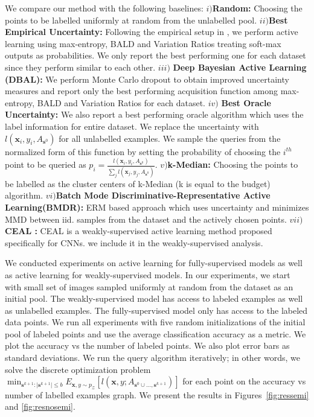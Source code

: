 \documentclass{article} %
\begin{document}
We compare our method with the following baselines: $i)$\textbf{Random:} Choosing the points to be labelled uniformly at
random from the unlabelled pool. $ii)$\textbf{Best Empirical Uncertainty:} Following the empirical setup in
\citep{gal_active}, we perform active learning using max-entropy, BALD and Variation Ratios treating soft-max outputs as
probabilities. We only report the best performing one for each dataset since they perform similar to each other. $iii)$
\textbf{Deep Bayesian Active Learning (DBAL)\citep{gal_active}:} We perform Monte Carlo dropout to obtain improved uncertainty measures and report
only the best performing acquisition function among max-entropy, BALD and Variation Ratios for each dataset. $iv)$
\textbf{Best Oracle Uncertainty:} We also report a best performing oracle algorithm which uses the label information for
entire dataset. We replace the uncertainty with $l(\mathbf{x}_i,y_i,A_{\mathbf{s}^0})$ for all unlabelled examples. We
sample the queries from the normalized form of this function by setting the probability of choosing the $i^{th}$ point
to be queried as $p_i=\frac{l(\mathbf{x}_i,y_i,A_{\mathbf{s}^0})}{\sum_j l(\mathbf{x}_j,y_j,A_{\mathbf{s}^0})}$. $v)$\textbf{k-Median:} Choosing the points to be labelled as the cluster centers of k-Median (k is equal to the budget) algorithm. $vi)$\textbf{Batch Mode Discriminative-Representative Active Learning(BMDR)\citep{kdd13}:} ERM based approach which uses uncertainty and minimizes MMD between iid. samples from the dataset and the actively chosen points. $vii)$\textbf{CEAL \citep{wang2016cost}:} CEAL \citep{wang2016cost} is a weakly-supervised active learning method proposed
specifically for CNNs. we include it in the weakly-supervised analysis.


We conducted experiments on active learning for fully-supervised models as well as active learning for weakly-supervised
models. In our experiments, we start with small set of images sampled uniformly at random from the dataset as an initial
pool. The weakly-supervised model has access to labeled examples as well as unlabelled examples. The fully-supervised
model only has access to the labeled data points. We run all experiments with five random initializations of the initial
pool of labeled points and use the average classification accuracy as a metric. We plot the accuracy vs the number of
labeled points. We also plot error bars as standard deviations. We run the query algorithm iteratively; in other
words, we solve the discrete optimization problem $\min_{\mathbf{s}^{k+1} : |\mathbf{s}^{k+1}| \leq b} E_{\mathbf{x},y
\sim p_\mathcal{Z}} [l(\mathbf{x},y; A_{\mathbf{s}^{0} \cup \ldots, \mathbf{s}^{k+1}})]$ for each point on the accuracy
vs number of labelled examples graph. We present the results in Figures~\ref{fig:ressemi} and \ref{fig:resnosemi}.
\end{document}
